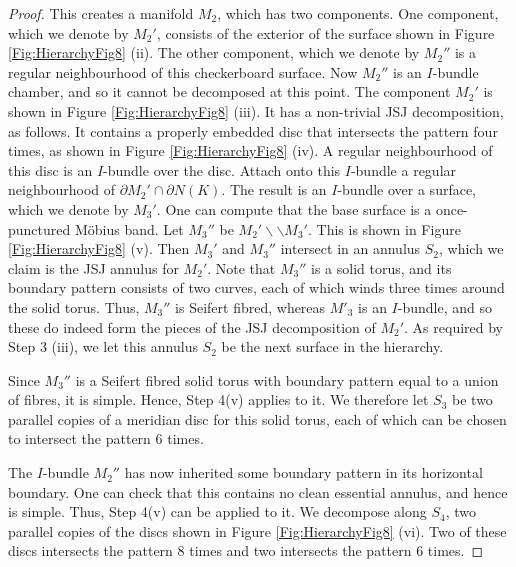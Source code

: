 \documentclass[oneside]{amsart}
\numberwithin{equation}{section}
\theoremstyle{plain}
\theoremstyle{definition}
\newcommand{\cut}{\backslash\backslash}
\begin{document}
\begin{proof}
This creates a manifold $M_2$, which has two components. One component,  which we denote by $M_2'$, consists of the exterior of the surface shown in Figure \ref{Fig:HierarchyFig8} (ii). The other component, which we denote by $M_2''$ is a regular neighbourhood of this checkerboard surface. Now $M_2''$ is an $I$-bundle chamber, and so it cannot be decomposed at this point. The component $M_2'$ is shown in Figure \ref{Fig:HierarchyFig8} (iii). It has a non-trivial JSJ decomposition, as follows. It contains a properly embedded disc that intersects the pattern four times, as shown in Figure \ref{Fig:HierarchyFig8} (iv). A regular neighbourhood of this disc is an $I$-bundle over the disc. Attach onto this $I$-bundle a regular neighbourhood of $\partial M_2' \cap \partial N(K)$. The result is an $I$-bundle over a surface, which we denote by $M_3'$. One can compute that the base surface is a once-punctured M\"obius band. Let $M_3''$ be $M_2' \cut M_3'$. This is shown in Figure \ref{Fig:HierarchyFig8} (v). Then $M_3'$ and $M_3''$ intersect in an annulus $S_2$, which we claim is the JSJ annulus for $M_2'$. Note that $M_3''$ is a solid torus, and its boundary pattern consists of two curves, each of which winds three times around the solid torus. Thus, $M_3''$ is Seifert fibred, whereas $M'_3$ is an $I$-bundle, and so these do indeed form the pieces of the JSJ decomposition of $M_2'$. As required by Step 3 (iii), we let this annulus $S_2$ be the next surface in the hierarchy.

Since $M_3''$ is a Seifert fibred solid torus with boundary pattern equal to a union of fibres, it is simple. Hence, Step 4(v) applies to it. We therefore let $S_3$ be two parallel copies of a meridian disc for this solid torus, each of which can be chosen to intersect the pattern 6 times.

The $I$-bundle $M_2''$ has now inherited some boundary pattern in its horizontal boundary. One can check that this contains no clean essential annulus, and hence is simple. Thus, Step 4(v) can be applied to it. We decompose along $S_4$, two parallel copies of the discs shown in Figure \ref{Fig:HierarchyFig8} (vi). Two of these discs intersects the pattern 8 times and two intersects the pattern 6 times. 


\end{proof}
\end{document}
